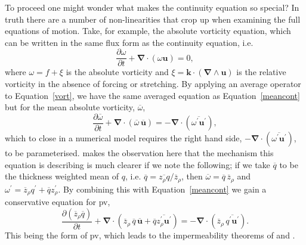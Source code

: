 \documentclass[12pt,a4paper]{report}
\newcommand*\mean[1]{\overline{#1}}
\newcommand*\res[1]{{#1}^{\prime}}
\newcommand*\equref[1]{Equation~\eqref{#1}}
\begin{document}
         To proceed one might wonder what makes the continuity equation
         so special? In truth there are a number of non-linearities that
         crop up when examining the full equations of motion. Take, for example, the
         absolute vorticity equation, which can be written in the same flux form as the continuity equation, i.e.
           \begin{equation}
           \frac{\partial \omega}{\partial t} + \boldsymbol{\nabla}\cdot\left(\omega\boldsymbol{u}\right) = 0,
           \label{vort}
           \end{equation}
           where $\omega=f+\xi$ is the absolute vorticity and
           $\xi = \boldsymbol{k} \cdot\left( \boldsymbol{\nabla}\wedge \boldsymbol{u}\right)$ is the relative vorticity
           in the absence of forcing or stretching. 
           By applying an average operator to \equref{vort}, we have the same averaged equation as \equref{meancont} but for the mean absolute vorticity, $\mean{\omega}$,
                \begin{equation}
                \frac{\partial \mean{\omega}}{\partial t} + \boldsymbol{\nabla}\cdot\left(\mean{\omega} \, \mean{\boldsymbol{u}}\right) = - \boldsymbol{\nabla}\cdot\left(\mean{\res{\omega} \res{\boldsymbol{u}}}\right),
                \end{equation}
                which to close in a numerical model requires the
                right hand side, $- \boldsymbol{\nabla}\cdot\left(\mean{\res{\omega} \res{\boldsymbol{u}}}\right)$, to be parameterised.
                \cite{greatbatch1998exploring} makes the observation
                here that the mechanism this equation is describing 
                is much clearer if we note the following; if we take
                $\mean{q}$ to be the thickness weighted mean of $q$, i.e.
                $\mean{q}=\mean{z_{\rho}q}/\mean{z}_{\rho}$, then 
                $\mean{\omega}=\mean{q}\,\mean{z}_{\rho}$ and $\res{\omega}=\mean{z}_{\rho}\res{q}+\mean{q}\res{z}_{\rho}$. By 
                combining this with \equref{meancont} we gain a conservative equation 
                for \gls{pv}, 
                \begin{equation}
                \frac{\partial \left(\mean{z}_{\rho} \mean{q}\right)}{\partial t} +
                 \boldsymbol{\nabla}\cdot\left(\mean{z}_{\rho}\,\mean{q}\,\mean{\boldsymbol{u}}+\mean{q}\mean{\res{z}_{\rho} \res{\boldsymbol{u}}}\right)
                 = - \boldsymbol{\nabla}\cdot\left(\mean{z}_{\rho}\,\mean{\res{q} \res{\boldsymbol{u}}}\right) .
                 \label{meanpveq}
                \end{equation}
                This being the form of \gls{pv}, which leads to the impermeability theorems
                of \cite{haynes1987evolution} and \cite{haynes1990conservation}.
                
\end{document}
